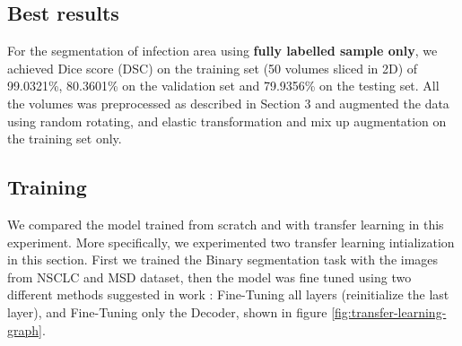\subsection{Best results}
For the segmentation of infection area using \textbf{fully labelled sample only}, we achieved Dice score (DSC) on the training set (50 volumes sliced in 2D) of 99.0321\%, 80.3601\% on the validation set and 79.9356\% on the testing set. All the volumes was preprocessed as described in Section 3 and augmented the data using random rotating, and elastic transformation and {\color{red}mix up augmentation} on the training set only.

\subsection{Training}
We compared the model trained from scratch and with transfer learning in this experiment. More specifically, we experimented two transfer learning intialization in this section. First we trained the Binary segmentation task with the images from NSCLC and MSD dataset, then the model was fine tuned using two different methods suggested in work \cite{wang_improving_2019}: Fine-Tuning all layers (reinitialize the last layer), and Fine-Tuning only the Decoder, shown in figure \ref{fig:transfer-learning-graph}.\\

